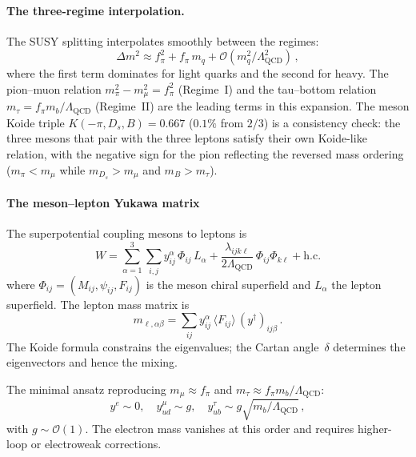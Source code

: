 \documentclass[aps,prd,twocolumn,showpacs,preprintnumbers,superscriptaddress]{revtex4-2}
\newcommand{\Lqcd}{\Lambda_{\mathrm{QCD}}}
\begin{document}
\paragraph{The three-regime interpolation.}

The SUSY splitting interpolates smoothly between the regimes:
\begin{equation}
  \Delta m^2 \approx f_\pi^2 + f_\pi\,m_q + \mathcal{O}(m_q^2/\Lqcd^2)\,,
\end{equation}
where the first term dominates for light quarks and the
second for heavy.
The pion--muon relation $m_\pi^2 - m_\mu^2 = f_\pi^2$
(Regime~I) and the tau--bottom relation
$m_\tau = f_\pi m_b/\Lqcd$ (Regime~II) are the leading
terms in this expansion.
The meson Koide triple $K(-\pi, D_s, B) = 0.667$ ($0.1\%$
from $2/3$) is a consistency check: the three mesons that
pair with the three leptons satisfy their own Koide-like
relation, with the negative sign for the pion reflecting
the reversed mass ordering ($m_\pi < m_\mu$ while
$m_{D_s} > m_\mu$ and $m_B > m_\tau$).

\paragraph{The meson--lepton Yukawa matrix}

The superpotential coupling mesons to leptons is
\begin{equation}
  W = \sum_{\alpha=1}^3 \sum_{i,j} y^\alpha_{ij}\,\Phi_{ij}\,L_\alpha
  + \frac{\lambda_{ijk\ell}}{2\Lqcd}\,\Phi_{ij}\Phi_{k\ell}
  + \text{h.c.}
  \label{eq:superpotential}
\end{equation}
where $\Phi_{ij} = (M_{ij}, \psi_{ij}, F_{ij})$ is the
meson chiral superfield and $L_\alpha$ the lepton superfield.
The lepton mass matrix is
\begin{equation}
  m_{\ell,\alpha\beta} = \sum_{ij} y^\alpha_{ij}\,
  \langle F_{ij}\rangle\,(y^\dagger)_{ij\beta}\,.
  \label{eq:lepton_mass}
\end{equation}
The Koide formula constrains the eigenvalues; the Cartan
angle~$\delta$ determines the eigenvectors and hence the
mixing.

The minimal ansatz reproducing
$m_\mu \approx f_\pi$ and $m_\tau \approx f_\pi m_b/\Lqcd$:
\begin{equation}
  y^e \sim 0,\quad
  y^\mu_{ud} \sim g,\quad
  y^\tau_{ub} \sim g\sqrt{m_b/\Lqcd}\,,
  \label{eq:yukawa_ansatz}
\end{equation}
with $g \sim \mathcal{O}(1)$.  The electron mass vanishes
at this order and requires higher-loop or electroweak
corrections.
\end{document}
